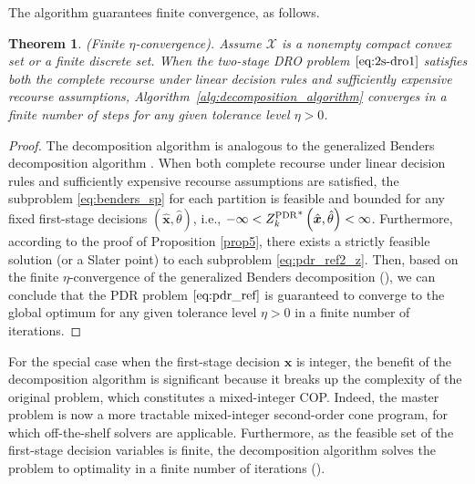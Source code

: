 \documentclass{article}
\newtheorem{theorem}{Theorem}
\begin{document}
 The algorithm guarantees finite convergence, as follows.
\begin{theorem} \textup{(Finite $\eta$-convergence).} \label{finite convoergence}
Assume $\mathcal{X}$ is a nonempty compact convex set or a finite discrete set. When the two-stage DRO problem $\eqref{eq:2s-dro1}$ satisfies both the complete recourse under linear decision rules and sufficiently expensive recourse assumptions, Algorithm~\ref{alg:decomposition_algorithm} converges in a finite number of steps for any given tolerance level $\eta > 0$.
\end{theorem}

\begin{proof}
The decomposition algorithm is analogous to the generalized Benders decomposition algorithm \cite{GBD1}. %
When both complete recourse under linear decision rules and sufficiently expensive recourse assumptions are satisfied,  the subproblem \eqref{eq:benders_sp} for each partition is feasible and bounded for any fixed first-stage decisions $(\hat{\bm x}, \hat{\theta})$, i.e., $-\infty < {Z^{\textup{PDR}}_k}^* \left(\hat{\bm x}, \hat{\theta} \right)< \infty$. Furthermore, according to the proof of Proposition \ref{prop5}, there exists a strictly feasible solution (or a Slater point) to each subproblem \eqref{eq:pdr_ref2_z}. 
Then, based on the finite $\eta$-convergence of the generalized Benders decomposition (\cite[Theorems 2.4 and 2.5]{GBD1}), we can conclude that the PDR problem $\eqref{eq:pdr_ref}$ is guaranteed to converge to the global optimum for any given tolerance level $\eta > 0$ in a finite number of iterations.
\end{proof}
For the special case when the first-stage decision $\bm x$ is integer, the benefit of the decomposition algorithm is significant because it breaks up the complexity of the original problem, which constitutes a mixed-integer COP. %
Indeed, the master problem is now a more tractable mixed-integer second-order cone program, for which off-the-shelf solvers are applicable. %
Furthermore, as the feasible set of the first-stage decision variables is finite,  the decomposition algorithm solves the problem to optimality in a finite number of iterations (\cite[Theorem 2.4]{GBD1}). %
\end{document}
